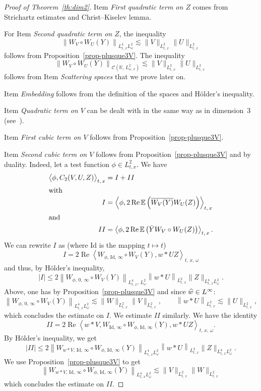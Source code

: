 \documentclass[10pt]{amsart}
\theoremstyle{definition}\newtheorem{defi}[theo]{Definition}\newtheorem{rema}[theo]{Remark}\newtheorem{exam}[theo]{Example}\newtheorem{exem}[theo]{Example}\newtheorem{nota}[theo]{Notation}
\newcommand{\R}{\mathbb{R}}
\newcommand{\E}{\mathbb{E}}
\DeclareMathOperator{\re}{Re}
\newcommand{\Id}{\mathrm{Id}}
\newcommand{\mclC}{\mathcal{C}}
\let\oldhat\hat
\renewcommand*{\hat}[1]{\mathchoice{\widehat{#1}}{\widehat{#1}}{\oldhat{#1}}{\oldhat{#1}}}
\begin{document}
\begin{proof}[Proof of Theorem~\ref{th:dim2}]
Item \emph{First quadratic term on $Z$} comes from Strichartz estimates and Christ--Kiselev lemma.

For Item \emph{Second quadratic term on $Z$}, the inequality
\[
\left\|W_V\circ W_U (Y) \right\|_{L^4_{t,\,x} L^2_\omega} \lesssim \|V\|_{L^2_{t,\,x}} \|U\|_{L^2_{t,\,x}}
\]
follows from Proposition~\ref{prop-plusque3V}. The inequality
\[
\left\|W_V\circ W_U (Y) \right\|_{\mclC\left(\R,\,L^2_{\omega,\,x}\right)} \lesssim \|V\|_{L^2_{t,\,x}} \|U\|_{L^2_{t,\,x}}
\]
follows from Item \emph{Scattering spaces} that we prove later on.

Item \emph{Embedding} follows from the definition of the spaces and H\"older's inequality.

Item \emph{Quadratic term on $V$} can be dealt with in the same way as in dimension~3 (see~\cite{lewsab2}).

Item \emph{First cubic term on $V$} follows from Proposition~\ref{prop-plusque3V}.

Item \emph{Second cubic term on $V$} follows from Proposition~\ref{prop-plusque3V} and by duality. Indeed, let a test function $\phi \in L^2_{t,x}$. We have
\begin{align*}
\big\langle\phi, C_2(V,U,Z)\big\rangle_{t,\,x} &= I + II
\\
\intertext{with}
I &= \left\langle\phi, 2\re \E\left(\overline{W_V(Y)} W_U(Z)\right)\right\rangle_{t,\,x} \\
\intertext{and}
II &= \left\langle\phi,2\re \E \left(\bar Y W_V \circ W_U (Z)\right)\right\rangle_{t,\,x}.
\end{align*}
We can rewrite $I$ as (where $\Id$ is the mapping $t\mapsto t$)
\[
I = 2 \re \left\langle W_{\phi,\,\Id,\,\infty} \circ W_V (Y), w* U Z\right\rangle_{t,\,x,\,\omega}
\]
and thus, by H\"older's inequality,
\[
|I| \leq 2 \left\| W_{\phi,\,0,\,\infty} \circ W_V (Y)\right\|_{L^4_{t,\,x},\,L^2_\omega} \left\|w*U\right\|_{L^2_{t,\,x}} \|Z\|_{L^4_{t,\,x} L^2_\omega}.
\]
Above, one has by Proposition~\ref{prop-plusque3V} and since $\hat w\in L^{\infty}$:
\[
\left\| W_{\phi,\,0,\,\infty} \circ W_V (Y)\right\|_{L^4_{t,\,x} L^2_\omega} \lesssim \|W\|_{L^2_{t,\,x}} \|V\|_{L^2_{t,\,x}}, \qquad  \left\|w*U\right\|_{L^2_{t,\,x}} \lesssim \|U\|_{L^2_{t,\,x}},
\]
which concludes the estimate on $I$. We estimate $II$ similarly. We have the identity
\[
II = 2 \re \left\langle w*V,W_{\Id,\,\infty} \circ W_{\phi,\,\Id,\,\infty}(Y), w*U Z\right\rangle_{t,\,x,\,\omega}.
\]
By H\"older's inequality, we get
\[
|II|\leq 2 \left\|W_{w*V,\,\Id,\,\infty} \circ W_{\phi,\,\Id,\,\infty}(Y)\right\|_{L^4_{t,\,x} L^2_\omega}\left\|w*U\right\|_{L^2_{t,\,x}} \|Z\|_{L^4_{t,\,x} L^2_\omega}.
\]
We use Proposition~\ref{prop-plusque3V} to get
\[
\left\|W_{w*V,\,\Id,\,\infty} \circ W_{\phi,\,\Id,\,\infty}(Y)\right\|_{L^4_{t,\,x} L^2_\omega} \lesssim \|V\|_{L^2_{t,\,x}} \|W\|_{L^2_{t,\,x}}
\]
which concludes the estimate on $II$.


\end{proof}
\end{document}
